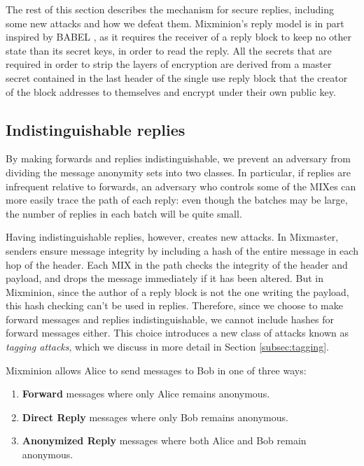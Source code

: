\documentclass{llncs}
\begin{document}
The rest of this section describes the mechanism for secure replies,
including some new attacks and how we defeat them. Mixminion's reply
model is in part inspired by BABEL \cite{babel}, as it requires the
receiver of a reply block to keep no other state than its secret keys,
in order to read the reply.  All the secrets that are required in
order to strip the layers of encryption are derived from a master
secret contained in the last header of the single use reply block that
the creator of the block addresses to themselves and encrypt under
their own public key.

\subsection{Indistinguishable replies}
\label{subsec:header-swap}

By making forwards and replies indistinguishable, we prevent an adversary
from dividing the message anonymity sets into two classes. In particular,
if replies are infrequent relative to forwards, an adversary who controls
some of the MIXes can more easily trace the path of each reply:  even
though the batches may be large, the number of replies in each batch
will be quite small.

Having indistinguishable replies, however, creates new attacks.  In
Mixmaster, senders ensure message integrity by including a hash of
the entire message in each hop of the header.  Each MIX in the path
checks the integrity of the header and payload, and drops the message
immediately if it has been altered.  But in Mixminion, since the
author of a reply block is not the one writing the payload, this
hash checking can't be used in replies. Therefore, since we choose to make
forward messages and replies indistinguishable, we cannot include
hashes for forward messages either. This choice introduces a new class
of attacks known as \emph{tagging attacks}, which we discuss in more
detail in Section \ref{subsec:tagging}.

Mixminion allows Alice to send messages to Bob in one of three ways:

\begin{enumerate}
\item \textbf{Forward} messages where only Alice remains anonymous.
\item \textbf{Direct Reply} messages where only Bob remains anonymous.
\item \textbf{Anonymized Reply} messages where both Alice and Bob
   remain anonymous.
\end{enumerate}
\end{document}
